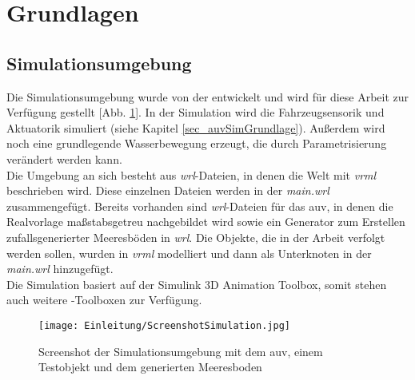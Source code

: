 \section{Grundlagen}
\subsection{Simulationsumgebung}
Die Simulationsumgebung wurde von der \atlas entwickelt und wird für diese Arbeit zur Verfügung gestellt [Abb. \ref{screenSim}].
In der Simulation wird die Fahrzeugsensorik und Aktuatorik simuliert (siehe Kapitel \ref{sec_auvSimGrundlage}). Außerdem wird noch eine grundlegende Wasserbewegung erzeugt, die durch Parametrisierung verändert werden kann.\\

Die Umgebung an sich besteht aus \textit{wrl}-Dateien, in denen die Welt mit \textit{\gls{vrml}} beschrieben wird. Diese einzelnen Dateien werden in der \textit{main.wrl} zusammengefügt. Bereits vorhanden sind \textit{wrl}-Dateien für das \gls{auv}, in denen die Realvorlage maßstabsgetreu nachgebildet wird sowie ein Generator zum Erstellen zufallsgenerierter Meeresböden in \textit{wrl}. Die Objekte, die in der Arbeit verfolgt werden sollen, wurden in \textit{\gls{vrml}} modelliert und dann als Unterknoten in der \textit{main.wrl} hinzugefügt.\\
Die Simulation basiert auf der \matlab Simulink 3D Animation Toolbox, somit stehen auch weitere \matlab -Toolboxen zur Verfügung. 
\begin{figure}[H]
\texttt{[image: Einleitung/ScreenshotSimulation.jpg]}
\caption[Screenshot der Simulationsumgebung]{Screenshot der Simulationsumgebung mit dem \gls{auv}, einem Testobjekt und dem generierten Meeresboden}
\label{screenSim}
\end{figure}
